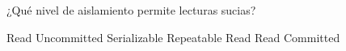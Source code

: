 \question[1] ¿Qué nivel de aislamiento permite lecturas sucias?
\begin{choices}
\CorrectChoice Read Uncommitted
\choice Serializable
\choice Repeatable Read
\choice Read Committed
\end{choices}